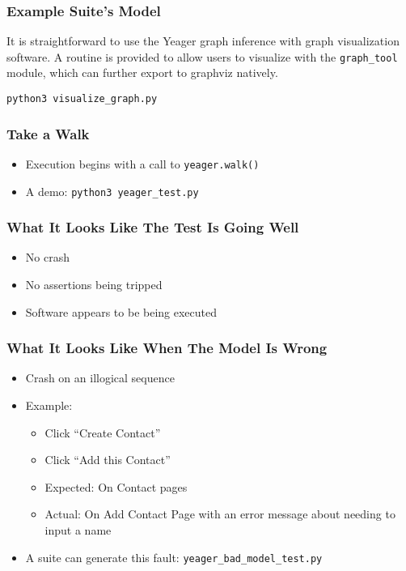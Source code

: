 \begin{frame}
  \frametitle{Example Suite's Model}
  It is straightforward to use the Yeager graph inference with graph visualization software. A routine is provided to allow users to visualize with the \texttt{graph\_tool} module, which can further export to graphviz natively.

  \texttt{python3 visualize\_graph.py} %
\end{frame}

\begin{frame}
  \frametitle{Take a Walk}
  \begin{itemize}
    \item Execution begins with a call to \texttt{yeager.walk()}
    \item A demo: \texttt{python3 yeager\_test.py} %
  \end{itemize}
\end{frame}

\begin{frame}
  \frametitle{What It Looks Like The Test Is Going Well}
  \begin{itemize}
    \item No crash
    \item No assertions being tripped
    \item Software appears to be being executed
  \end{itemize}
\end{frame}

\begin{frame}
  \frametitle{What It Looks Like When The Model Is Wrong}
  \begin{itemize}
    \item Crash on an illogical sequence
    \item Example:
    \begin{itemize}
      \item Click ``Create Contact''
      \item Click ``Add this Contact''
      \item Expected: On Contact pages
      \item Actual: On Add Contact Page with an error message about needing to input a name
    \end{itemize}
    \item A suite can generate this fault: \texttt{yeager\_bad\_model\_test.py} %
  \end{itemize}
\end{frame}

